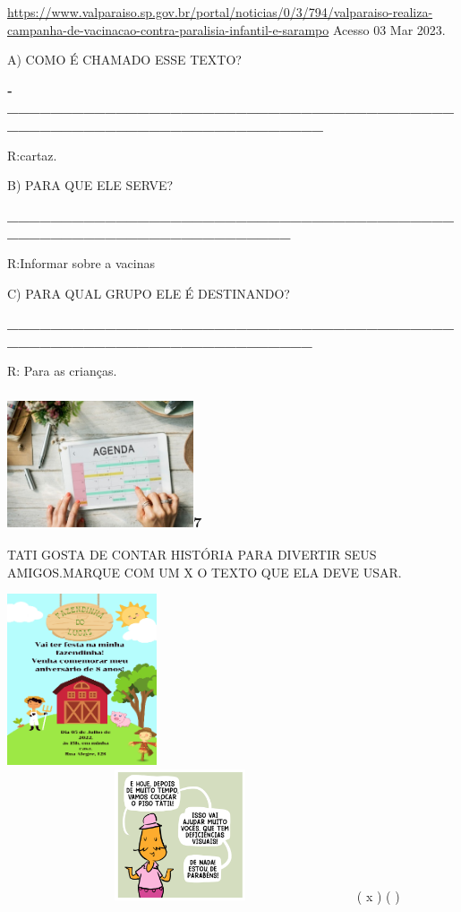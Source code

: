 \url{https://www.valparaiso.sp.gov.br/portal/noticias/0/3/794/valparaiso-realiza-campanha-de-vacinacao-contra-paralisia-infantil-e-sarampo}
Acesso 03 Mar 2023.

A) COMO É CHAMADO ESSE TEXTO?

\textbf{­­­­­­­­­­­­­­­­­­­­­\_\_\_\_\_\_\_\_\_\_\_\_\_\_\_\_\_\_\_\_\_\_\_\_\_\_\_\_\_\_\_\_\_\_\_\_\_\_\_\_\_\_\_\_\_\_\_\_\_\_\_\_\_\_\_\_\_\_\_\_\_\_\_\_\_\_\_\_\_\_}

R:cartaz.

B) PARA QUE ELE SERVE?

\textbf{\_\_\_\_\_\_\_\_\_\_\_\_\_\_\_\_\_\_\_\_\_\_\_\_\_\_\_\_\_\_\_\_\_\_\_\_\_\_\_\_\_\_\_\_\_\_\_\_\_\_\_\_\_\_\_\_\_\_\_\_\_\_\_\_\_\_\_}

R:Informar sobre a vacinas

C) PARA QUAL GRUPO ELE É DESTINANDO?

\textbf{\_\_\_\_\_\_\_\_\_\_\_\_\_\_\_\_\_\_\_\_\_\_\_\_\_\_\_\_\_\_\_\_\_\_\_\_\_\_\_\_\_\_\_\_\_\_\_\_\_\_\_\_\_\_\_\_\_\_\_\_\_\_\_\_\_\_\_\_\_}

R: Para as crianças.

\subsubsection[7
]{\texorpdfstring{\protect\includegraphics[width=2.16667in,height=1.47014in]{media/image108.jpeg}7
}{7 }}\label{section-48}

TATI GOSTA DE CONTAR HISTÓRIA PARA DIVERTIR SEUS AMIGOS.MARQUE COM UM X
O TEXTO QUE ELA DEVE USAR.

\includegraphics[width=1.73819in,height=1.98472in]{media/image109.png}\includegraphics[width=4.02222in,height=1.52917in]{media/image110.png}
( x ) ( )

